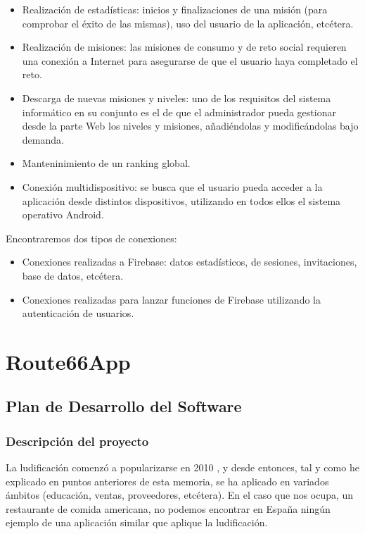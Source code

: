 \documentclass[twoside]{report}
\begin{document}
\begin{itemize}
\item Realización de estadísticas: inicios y finalizaciones de una misión (para comprobar el éxito de las mismas), uso del usuario de la aplicación, etcétera.

\item Realización de misiones: las misiones de consumo y de reto social requieren una conexión a Internet para asegurarse de que el usuario haya completado el reto.

\item Descarga de nuevas misiones y niveles: uno de los requisitos del sistema informático en su conjunto es el de que el administrador pueda gestionar desde la parte Web los niveles y misiones, añadiéndolas y modificándolas bajo demanda.

\item Manteninimiento de un ranking global.

\item Conexión multidispositivo: se busca que el usuario pueda acceder a la aplicación desde distintos dispositivos, utilizando en todos ellos el sistema operativo Android.
\end{itemize}

Encontraremos dos tipos de conexiones:

\begin{itemize}
\item Conexiones realizadas a Firebase: datos estadísticos, de sesiones, invitaciones, base de datos, etcétera.

\item Conexiones realizadas para lanzar funciones de Firebase utilizando la autenticación de usuarios.

\end{itemize}


\chapter{Route66App}
\section{Plan de Desarrollo del Software}
\subsection{Descripción del proyecto}

La ludificación comenzó a popularizarse en 2010 \cite{anatfg}, y desde entonces, tal y como he explicado en puntos anteriores de esta memoria, se ha aplicado en variados ámbitos (educación, ventas, proveedores, etcétera). En el caso que nos ocupa, un restaurante de comida americana, no podemos encontrar en España ningún ejemplo de una aplicación similar que aplique la ludificación.
\end{document}
